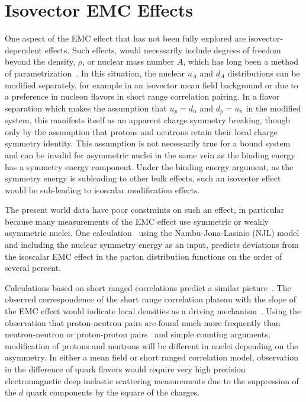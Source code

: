 \section{Isovector EMC Effects}

One aspect of the EMC effect that has not been fully explored are isovector-dependent effects.  Such effects, would necessarily include degrees of freedom beyond the density, $\rho$, or nuclear mass number $A$, which has long been a method of parametrization~\cite{Malace:2014uea}.  In this situation, the nuclear $u_A$ and $d_A$ distributions can be modified separately, for example in an isovector mean field background or due to a preference in nucleon flavors in short range correlation pairing.  In a flavor separation which makes the assumption that $u_p = d_n$ and $d_p = u_n$ in the modified system, this manifests itself as an apparent charge symmetry breaking, though only by the assumption that protons and neutrons retain their local charge symmetry identity. This assumption is not necessarily true for a bound system and can be invalid for asymmetric nuclei in the same vein as the binding energy has a symmetry energy component.  Under the binding energy argument, as the symmetry energy is subleading to other bulk effects, such an isovector effect would be sub-leading to isoscalar modification effects.

The present world data have poor constraints on such an effect, in particular because many measurements of the EMC effect use symmetric or weakly asymmetric nuclei.  One calculation~\cite{Cloet:2009qs} using the Nambu-Jona-Lasinio (NJL) model and including the nuclear symmetry energy as an input, predicts deviations from the isoscalar EMC effect in the parton distribution functions on the order of several percent.   

Calculations based on short ranged correlations predict a similar picture~\cite{Sargsian:2012sm, Arrington:2015wja}.  The observed correspondence of the short range correlation plateau with the slope of the EMC effect would indicate local densities as a driving mechanism~\cite{Weinstein:2010rt}.  Using the observation that proton-neutron pairs are found much more frequently than neutron-neutron or proton-proton pairs~\cite{Subedi:2008zz} and simple counting arguments, modification of protons and neutrons will be different in nuclei depending on the asymmetry.  In either a mean field or short ranged correlation model, observation in the difference of quark flavors would require very high precision electromagnetic deep inelastic scattering measurements due to the suppression of the $d$ quark components by the square of the charges. 

